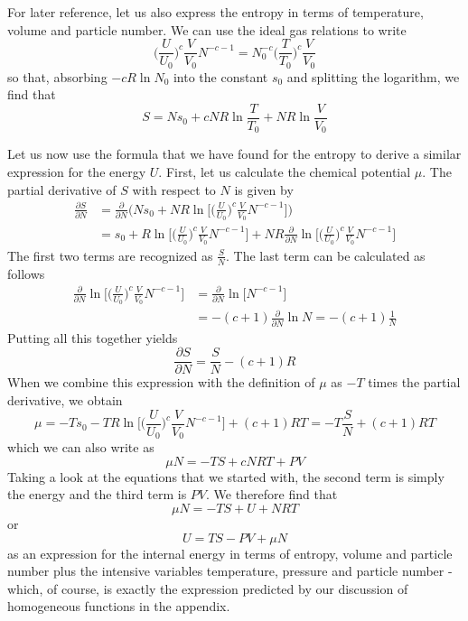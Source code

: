 \documentclass[a4paper, draft]{article}
\theoremstyle{own}
\theoremstyle{remark}
\begin{document}
For later reference, let us also express the entropy in terms of temperature, volume and particle number. We can use the ideal gas relations to write
$$
\big( \frac{U}{U_0} \big)^c \frac{V}{V_0} N^{-c - 1} = N_0^{-c}  \big(  \frac{T}{T_0} \big)^{c} \frac{V}{V_0}
$$
so that, absorbing $-c R \ln  N_0$ into the constant $s_0$ and splitting the logarithm, we find that
$$
S = N s_0 + c N R \ln \frac{T}{T_0}  + N R \ln \frac{V}{V_0}  
$$

Let us now use the formula that we have found for the entropy to derive a similar expression for the energy $U$.
First, let us calculate the chemical potential $\mu$. The partial derivative of $S$ with respect to $N$ is given by
\begin{align*}
\frac{\partial S}{\partial N} &= \frac{\partial}{\partial N} \big( N s_0 + N R \ln \big[ \big( \frac{U}{U_0} \big)^c \frac{V}{V_0} N^{-c - 1}  \big]  \big)    \\
&= s_0 + R \ln \big[ \big( \frac{U}{U_0} \big)^c \frac{V}{V_0} N^{-c - 1}  \big] + N R \frac{\partial}{\partial N}  \ln \big[ \big( \frac{U}{U_0} \big)^c \frac{V}{V_0} N^{-c - 1}  \big]
\end{align*}
The first two terms are recognized as $\frac{S}{N}$. The last term can be calculated as follows
\begin{align*}
\frac{\partial}{\partial N}  \ln \big[ \big( \frac{U}{U_0} \big)^c \frac{V}{V_0} N^{-c - 1}  \big] &= 
\frac{\partial}{\partial N}   \ln \big[  N^{-c - 1}  \big] \\
&= -(c+1) \frac{\partial}{\partial N}   \ln N = - (c+1) \frac{1}{N}
\end{align*}
Putting all this together yields
$$
\frac{\partial S}{\partial N} = \frac{S}{N} - (c+1) R
$$
When we combine this expression with the definition of $\mu$ as $-T$ times the partial derivative, we obtain
$$
\mu  = -T s_0 - T R \ln \big[ \big( \frac{U}{U_0} \big)^c \frac{V}{V_0} N^{-c - 1}  \big] + (c+1) RT = - T \frac{S}{N} + (c+1) RT 
$$
which we can also write as
$$
\mu N = - T S + c NRT + PV
$$
Taking a look at the equations that we started with, the second term is simply the energy and the third term is $PV$. We therefore find that
$$
\mu N = - TS + U + NRT
$$
or 
$$
U = TS - PV + \mu N
$$
as an expression for the internal energy in terms of entropy, volume and particle number plus the intensive variables temperature, pressure and particle number - which, of course, is exactly the expression predicted by our discussion of homogeneous functions in the appendix.
\end{document}
